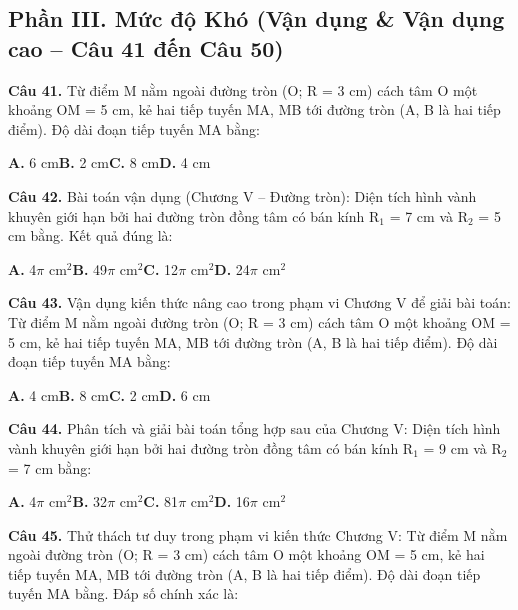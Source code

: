 \documentclass[11pt,a4paper]{article}
\begin{document}
\subsection*{\color{accent} Phần III. Mức độ Khó (Vận dụng \& Vận dụng cao -- Câu 41 đến Câu 50)}
\textbf{\color{primary} Câu 41.} Từ điểm M nằm ngoài đường tròn (O; R = 3 cm) cách tâm O một khoảng OM = 5 cm, kẻ hai tiếp tuyến MA, MB tới đường tròn (A, B là hai tiếp điểm). Độ dài đoạn tiếp tuyến MA bằng:\par
\hspace*{1.5em}\textbf{A.} 6 cm\quad\quad \textbf{B.} 2 cm\quad\quad \textbf{C.} 8 cm\quad\quad \textbf{D.} 4 cm\par\vspace{2pt}
\textbf{\color{primary} Câu 42.} Bài toán vận dụng (Chương V – Đường tròn): Diện tích hình vành khuyên giới hạn bởi hai đường tròn đồng tâm có bán kính R$_1$ = 7 cm và R$_2$ = 5 cm bằng. Kết quả đúng là:\par
\hspace*{1.5em}\textbf{A.} 4$\pi$ cm$^2$\quad\quad \textbf{B.} 49$\pi$ cm$^2$\quad\quad \textbf{C.} 12$\pi$ cm$^2$\quad\quad \textbf{D.} 24$\pi$ cm$^2$\par\vspace{2pt}
\textbf{\color{primary} Câu 43.} Vận dụng kiến thức nâng cao trong phạm vi Chương V để giải bài toán: Từ điểm M nằm ngoài đường tròn (O; R = 3 cm) cách tâm O một khoảng OM = 5 cm, kẻ hai tiếp tuyến MA, MB tới đường tròn (A, B là hai tiếp điểm). Độ dài đoạn tiếp tuyến MA bằng:\par
\hspace*{1.5em}\textbf{A.} 4 cm\quad\quad \textbf{B.} 8 cm\quad\quad \textbf{C.} 2 cm\quad\quad \textbf{D.} 6 cm\par\vspace{2pt}
\textbf{\color{primary} Câu 44.} Phân tích và giải bài toán tổng hợp sau của Chương V: Diện tích hình vành khuyên giới hạn bởi hai đường tròn đồng tâm có bán kính R$_1$ = 9 cm và R$_2$ = 7 cm bằng:\par
\hspace*{1.5em}\textbf{A.} 4$\pi$ cm$^2$\quad\quad \textbf{B.} 32$\pi$ cm$^2$\quad\quad \textbf{C.} 81$\pi$ cm$^2$\quad\quad \textbf{D.} 16$\pi$ cm$^2$\par\vspace{2pt}
\textbf{\color{primary} Câu 45.} Thử thách tư duy trong phạm vi kiến thức Chương V: Từ điểm M nằm ngoài đường tròn (O; R = 3 cm) cách tâm O một khoảng OM = 5 cm, kẻ hai tiếp tuyến MA, MB tới đường tròn (A, B là hai tiếp điểm). Độ dài đoạn tiếp tuyến MA bằng. Đáp số chính xác là:\par
\end{document}
